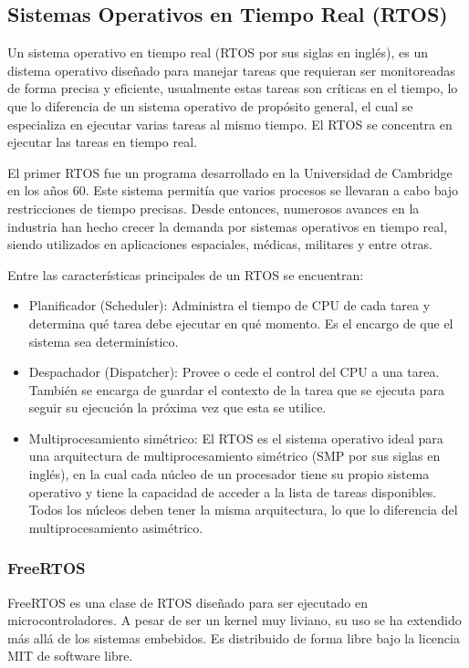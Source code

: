 \subsection{Sistemas Operativos en Tiempo Real (RTOS)} 
\label{subsec:rtossubsec}

Un sistema operativo en tiempo real (RTOS por sus siglas en inglés), es un distema operativo diseñado para manejar tareas que requieran ser monitoreadas de forma precisa y eficiente, usualmente estas tareas son críticas en el tiempo, lo que lo diferencia de un sistema operativo de propósito general, el cual se especializa en ejecutar varias tareas al mismo tiempo. El RTOS se concentra en ejecutar las tareas en tiempo real.

El primer RTOS fue un programa desarrollado en la Universidad de Cambridge en los años 60. Este sistema permitía que varios procesos se llevaran a cabo bajo restricciones de tiempo precisas. Desde entonces, numerosos avances en la industria han hecho crecer la demanda por sistemas operativos en tiempo real, siendo utilizados en aplicaciones espaciales, médicas, militares y entre otras.

Entre las características principales de un RTOS se encuentran:

\begin{itemize}
    \item Planificador (Scheduler): Administra el tiempo de CPU de cada tarea y determina qué tarea debe ejecutar en qué momento. Es el encargo de que el sistema sea determinístico.
    \item Despachador (Dispatcher): Provee o cede el control del CPU a una tarea. También se encarga de guardar el contexto de la tarea que se ejecuta para seguir su ejecución la próxima vez que esta se utilice.
    \item Multiprocesamiento simétrico: El RTOS es el sistema operativo ideal para una arquitectura de multiprocesamiento simétrico (SMP por sus siglas en inglés), en la cual cada núcleo de un procesador tiene su propio sistema operativo y tiene la capacidad de acceder a la lista de tareas disponibles. Todos los núcleos deben tener la misma arquitectura, lo que lo diferencia del multiprocesamiento asimétrico.
\end{itemize}

\subsubsection{FreeRTOS} FreeRTOS es una clase de RTOS diseñado para ser ejecutado en microcontroladores. A pesar de ser un kernel muy liviano, su uso se ha extendido más allá de los sistemas embebidos. Es distribuido de forma libre bajo la licencia MIT de software libre.

